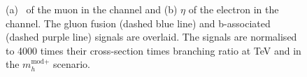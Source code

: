 \begin{figure}[h!]
\begin{center}
\end{center}
\caption[The \pT~of the muon in the \mutau channel
and $\eta$ of the electron in the \etau channel, with the signal
overlaid.]{(a) \pT~of the muon in the \mutau channel and (b) $\eta$ of the electron in the \etau channel.
The gluon fusion (dashed blue line)
and b-associated (dashed purple line) signals are overlaid. The signals are normalised to 4000 times their
cross-section times branching ratio at  TeV and  in the $m_{h}^{\text{mod+}}$ scenario.}
\label{fig:mt_muonpt}
\end{figure}
 
